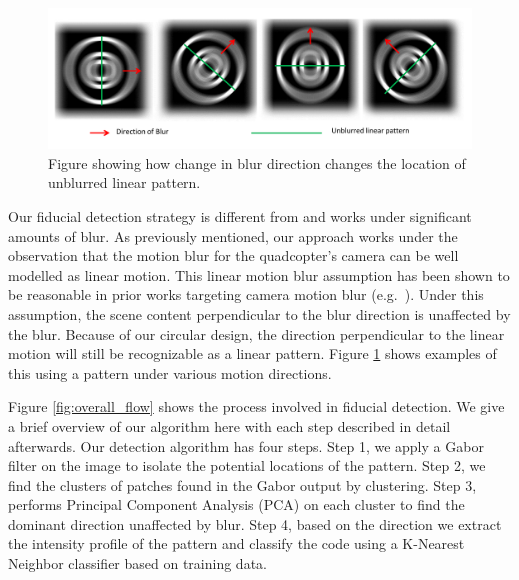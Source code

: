 \documentclass[10pt,twocolumn,letterpaper]{article}
\begin{document}
\begin{figure}
\centering
\includegraphics[width=0.8\linewidth]{blur_direction.pdf}
\caption{Figure showing how change in blur direction changes the location of
unblurred linear pattern.}
\label{fig:blur_direction}
\end{figure}

Our fiducial detection strategy is different from \cite{NaimarkF02,Pitag13} and works
under significant amounts of blur.   As previously mentioned, our approach works
under the observation that the motion blur for the quadcopter's camera
can be well modelled as linear motion.  This  linear motion blur assumption has
been shown to be reasonable in prior works targeting camera motion blur
(e.g.~\cite{Moshe:2003,Moshe:2004}). Under this assumption, the scene content
perpendicular to the blur direction is unaffected by the blur.  Because of our
circular design, the direction perpendicular to the linear motion will still be
recognizable as a linear pattern.  Figure \ref{fig:blur_direction} shows
examples of this using a pattern under various motion directions.

Figure \ref{fig:overall_flow} shows the process involved in fiducial
detection. We give a brief overview of our algorithm here with each step described 
in detail afterwards.  Our detection algorithm has four steps. Step 1,
we apply a Gabor filter on the image to isolate the
potential locations of the pattern.  Step 2, we find the clusters of patches
found in the Gabor output by clustering.  Step 3, performs Principal
Component Analysis (PCA) on each cluster to find the dominant direction
unaffected by blur.  Step 4, based on the direction we extract the intensity
profile of the pattern and classify the code using a K-Nearest Neighbor
classifier based on training data.
\end{document}
